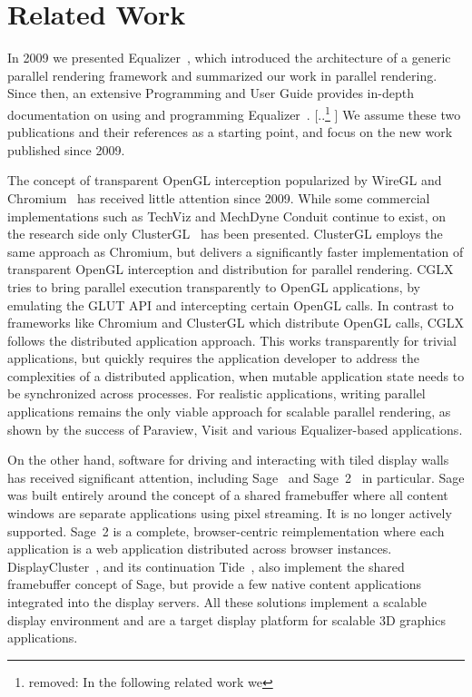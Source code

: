 \documentclass[10pt,journal,compsoc]{IEEEtran}
\providecommand{\DIFaddtex}[1]{{\protect\color{blue} \sf #1}} %
\providecommand{\DIFdeltex}[1]{{\protect\color{red} [..\footnote{removed: #1} ]}} %
\providecommand{\DIFaddbegin}{} %
\providecommand{\DIFaddend}{} %
\providecommand{\DIFdelbegin}{} %
\providecommand{\DIFdelend}{} %
\providecommand{\DIFadd}[1]{\texorpdfstring{\DIFaddtex{#1}}{#1}} %
\providecommand{\DIFdel}[1]{\texorpdfstring{\DIFdeltex{#1}}{}} %
\newcommand{\DIFscaledelfig}{0.5}
\newlength{\DIFdelgraphicswidth} %
\newlength{\DIFdelgraphicsheight} %
\newcommand{\DIFaddincludegraphics}[2][]{{\color{blue}\fbox{\DIFOincludegraphics[#1]{#2}}}} %
\newcommand{\DIFdelincludegraphics}[2][]{%
\sbox{\DIFdelgraphicsbox}{\DIFOincludegraphics[#1]{#2}}%
\settoboxwidth{\DIFdelgraphicswidth}{\DIFdelgraphicsbox} %
\settoboxtotalheight{\DIFdelgraphicsheight}{\DIFdelgraphicsbox} %
\scalebox{\DIFscaledelfig}{%
\parbox[b]{\DIFdelgraphicswidth}{\usebox{\DIFdelgraphicsbox}\\[-\baselineskip] \rule{\DIFdelgraphicswidth}{0em}}\llap{\resizebox{\DIFdelgraphicswidth}{\DIFdelgraphicsheight}{%
\setlength{\unitlength}{\DIFdelgraphicswidth}%
\begin{picture}(1,1)%
\thicklines\linethickness{2pt} %
{\color[rgb]{1,0,0}\put(0,0){\framebox(1,1){}}}%
{\color[rgb]{1,0,0}\put(0,0){\line( 1,1){1}}}%
{\color[rgb]{1,0,0}\put(0,1){\line(1,-1){1}}}%
\end{picture}%
}\hspace*{3pt}}} %
} %
\DeclareRobustCommand{\DIFaddbegin}{\DIFOaddbegin \let\includegraphics\DIFaddincludegraphics} %
\DeclareRobustCommand{\DIFaddend}{\DIFOaddend \let\includegraphics\DIFOincludegraphics} %
\DeclareRobustCommand{\DIFdelbegin}{\DIFOdelbegin \let\includegraphics\DIFdelincludegraphics} %
\DeclareRobustCommand{\DIFdelend}{\DIFOaddend \let\includegraphics\DIFOincludegraphics} %
\begin{document}
\section{Related Work}\label{sec:related}

In 2009 we presented \textsf{Equalizer}~\cite{EMP:09}, which introduced the
architecture of a generic parallel rendering framework and summarized our work
in parallel rendering. Since then, an extensive Programming and User Guide
provides in-depth documentation on using and programming
\textsf{Equalizer}~\cite{Eilemann:13}. \DIFdelbegin \DIFdel{In the following related work we }\DIFdelend \DIFaddbegin \DIFadd{We }\DIFaddend assume these two publications and
their references as a starting point, and focus on the new work published since
2009.

The concept of transparent OpenGL interception popularized by \textsf{WireGL}
and \textsf{Chromium}~\cite{HHNFAKK:02} has received little attention since
2009. While some commercial implementations such as \textsf{TechViz} and
\textsf{MechDyne Conduit} continue to exist, on the research side only
\textsf{ClusterGL}~\cite{NHM:11} has been presented. \textsf{ClusterGL} employs
the same approach as \textsf{Chromium}, but delivers a significantly faster
implementation of transparent OpenGL interception and distribution for parallel
rendering. \textsf{CGLX}~\cite{DK:11} tries to bring parallel execution
transparently to OpenGL applications, by emulating the GLUT API and intercepting
certain OpenGL calls. In contrast to frameworks like \textsf{Chromium} and
\textsf{ClusterGL} which distribute OpenGL calls, \textsf{CGLX} follows the
distributed application approach. This works transparently for trivial
applications, but quickly requires the application developer to address the
complexities of a distributed application, when mutable application state needs
to be synchronized across processes. For realistic applications, writing
parallel applications remains the only viable approach for scalable parallel
rendering, as shown by the success of \textsf{Paraview}, \textsf{Visit} and
various \textsf{Equalizer}-based applications.

On the other hand, software for driving and interacting with tiled display walls
has received significant attention, including \textsf{Sage}~\cite{Sage} and
\textsf{Sage~2}~\cite{Sage2} in particular. \textsf{Sage} was built entirely
around the concept of a shared framebuffer where all content windows are
separate applications using pixel streaming. It is no longer actively supported.
\textsf{Sage~2} is a complete, browser-centric reimplementation where each
application is a web application distributed across browser instances.
\textsf{DisplayCluster}~\cite{DC}, and its continuation
\textsf{Tide}~\cite{tide}, also implement the shared framebuffer concept of
\textsf{Sage}, but provide a few native content applications integrated into the
display servers. All these solutions implement a scalable display environment and
are a target display platform for scalable 3D graphics applications.
\end{document}
